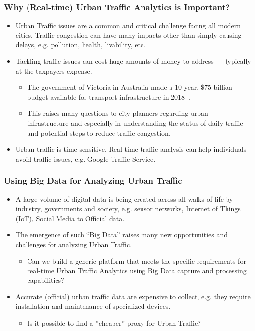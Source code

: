 \begin{frame}
    \frametitle{Why (Real-time) Urban Traffic Analytics is Important?}
    \begin{itemize}
	    \item Urban Traffic issues are a common and critical challenge facing all modern cities. Traffic congestion can have many impacts other than simply causing delays, e.g. pollution, health, livability, etc.
	    \item Tackling traffic issues can cost huge amounts of money to address --- typically at the taxpayers expense.
	    \begin{itemize}
            \item The government of Victoria in Australia made a 10-year, ${\$75}$ billion budget available for transport infrastructure in 2018~\cite{10YInvVic}.
            \item This raises many questions to city planners regarding urban infrastructure and especially in understanding the status of daily traffic and potential steps to reduce traffic congestion.
        \end{itemize}
        \item Urban traffic is time-sensitive. Real-time traffic analysis can help individuals avoid traffic issues, e.g. Google Traffic Service.
    \end{itemize}
\end{frame}

\begin{frame}
    \frametitle{Using Big Data for Analyzing Urban Traffic}
    \begin{itemize}
	    \item A large volume of digital data is being created across all walks of life by industry, governments and society, e.g. sensor networks, Internet of Things (IoT), Social Media to Official data.
	    \item The emergence of such ``Big Data'' raises many new opportunities and challenges for analyzing Urban Traffic.
	    \begin{itemize}
	        \item Can we build a generic platform that meets the specific requirements for real-time Urban Traffic Analytics using Big Data capture and processing capabilities?
	    \end{itemize}
	    \item Accurate (official) urban traffic data are expensive to collect, e.g.  they require installation and maintenance of specialized devices. 
	    \begin{itemize}
	        \item Is it possible to find a ''cheaper'' proxy for Urban Traffic?
	    \end{itemize}
    \end{itemize}
\end{frame}


